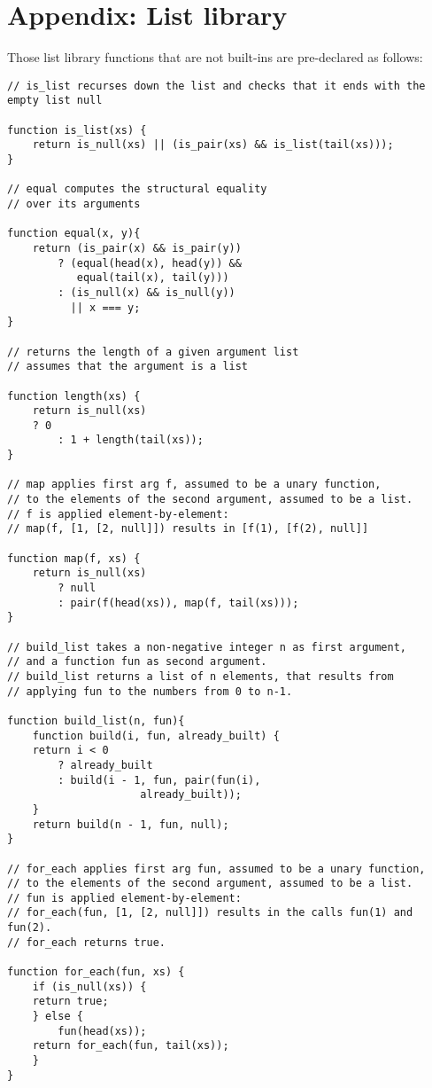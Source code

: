 \section*{Appendix: List library}

Those list library functions that are not built-ins are pre-declared as follows:

\begin{lstlisting}
// is_list recurses down the list and checks that it ends with the empty list null

function is_list(xs) {
    return is_null(xs) || (is_pair(xs) && is_list(tail(xs)));
}

// equal computes the structural equality 
// over its arguments

function equal(x, y){
    return (is_pair(x) && is_pair(y)) 
        ? (equal(head(x), head(y)) &&
           equal(tail(x), tail(y)))
        : (is_null(x) && is_null(y))
          || x === y;
}

// returns the length of a given argument list
// assumes that the argument is a list

function length(xs) {
    return is_null(xs) 
	? 0
        : 1 + length(tail(xs));
}

// map applies first arg f, assumed to be a unary function,
// to the elements of the second argument, assumed to be a list.
// f is applied element-by-element: 
// map(f, [1, [2, null]]) results in [f(1), [f(2), null]]

function map(f, xs) {
    return is_null(xs)
        ? null
        : pair(f(head(xs)), map(f, tail(xs)));
}

// build_list takes a non-negative integer n as first argument,
// and a function fun as second argument.
// build_list returns a list of n elements, that results from 
// applying fun to the numbers from 0 to n-1.

function build_list(n, fun){
    function build(i, fun, already_built) {
	return i < 0
	    ? already_built
	    : build(i - 1, fun, pair(fun(i),
		  		     already_built));
    }
    return build(n - 1, fun, null);
}

// for_each applies first arg fun, assumed to be a unary function,
// to the elements of the second argument, assumed to be a list.
// fun is applied element-by-element:
// for_each(fun, [1, [2, null]]) results in the calls fun(1) and fun(2).
// for_each returns true.

function for_each(fun, xs) {
    if (is_null(xs)) {
	return true;
    } else {
        fun(head(xs));
	return for_each(fun, tail(xs));
    }
}


\end{lstlisting}
